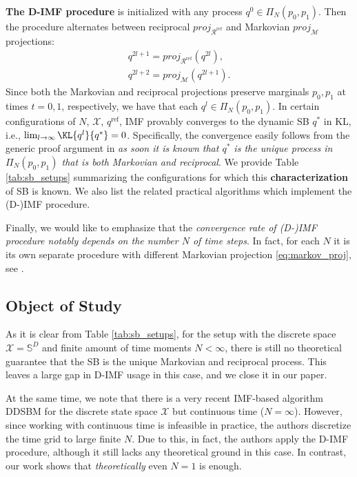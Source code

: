 \textbf{The D-IMF procedure} is initialized with any process $q^0 \in \Pi_{N}(p_0, p_1)$. Then the procedure alternates between reciprocal $proj_{\mathcal{R}^{\text{ref}}}$ and Markovian $proj_{\mathcal{M}}$ projections:
\begin{equation}
    \label{eq:d_imf}
    \begin{gathered}
        q^{2l+1} = proj_{\mathcal{R}^{\text{ref}}}\left(q^{2l}\right),
        \\
        q^{2l+2} = proj_{\mathcal{M}}\left(q^{2l+1}\right).
    \end{gathered}
\end{equation}
Since both the Markovian and reciprocal projections preserve marginals $p_0,p_1$ at times $t=0,1$, respectively, we have that each $q^{l}\in\Pi_{N}(p_0,p_1)$. In certain configurations of $N$, $\mathcal{X}$, $q^{\text{ref}}$, IMF provably converges to the dynamic SB $q^{*}$ in KL, i.e., $\lim_{l\rightarrow\infty}\KL{q^{l}}{q^{*}}=0$. Specifically, the convergence easily follows from the generic proof argument in \citep[Theorem 8]{shi2023diffusion} \textit{as soon it is known that $q^{*}$ is the unique process in $\Pi_{N}(p_0,p_1)$ that is both Markovian and reciprocal}. We provide Table \ref{tab:sb_setups} summarizing the configurations for which this \textbf{characterization} of SB is known. We also list the related practical algorithms which implement the (D-)IMF procedure.

Finally, we would like to emphasize that the \textit{convergence rate of (D-)IMF procedure notably depends on the number $N$ of time steps}. In fact, for each $N$ it is its own separate procedure with different Markovian projection \eqref{eq:markov_proj}, see \citep[Figure 6a]{gushchin2024adversarial}.

\subsection{Object of Study}
As it is clear from Table \ref{tab:sb_setups}, for the setup with the discrete space $\mathcal{X}=\mathbb{S}^{D}$ and finite amount of time moments $N<\infty$, there is still no theoretical guarantee that the SB is the unique Markovian and reciprocal process. This leaves a large gap in D-IMF usage in this case, and we close it in our paper. 

At the same time, we note that there is a very recent IMF-based algorithm DDSBM \cite{kim2024discrete} for the discrete state space $\mathcal{X}$ but continuous time ($N=\infty$). However, since working with continuous time is infeasible in practice, the authors discretize the time grid to large finite $N$. Due to this, in fact, the authors apply the D-IMF procedure, although it still lacks any theoretical ground in this case. In contrast, our work shows that \textit{theoretically} even $N=1$ is enough.